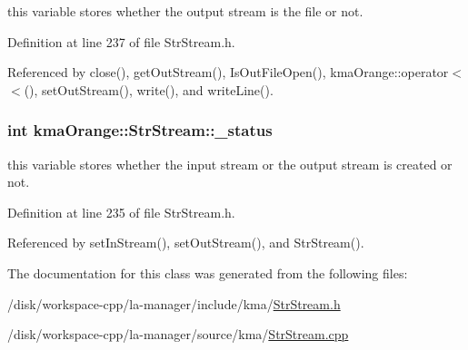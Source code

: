 this variable stores whether the output stream is the file or not. 



Definition at line 237 of file StrStream.h.

Referenced by close(), getOutStream(), IsOutFileOpen(), kmaOrange::operator$<$$<$(), setOutStream(), write(), and writeLine().\hypertarget{classkmaOrange_1_1StrStream_4e12ef11501334df836783f1f5328436}{
\subsubsection[{\_\-status}]{\setlength{\rightskip}{0pt plus 5cm}int {\bf kmaOrange::StrStream::\_\-status}}}
\label{classkmaOrange_1_1StrStream_4e12ef11501334df836783f1f5328436}


this variable stores whether the input stream or the output stream is created or not. 



Definition at line 235 of file StrStream.h.

Referenced by setInStream(), setOutStream(), and StrStream().

The documentation for this class was generated from the following files:\begin{CompactItemize}
\item 
/disk/workspace-cpp/la-manager/include/kma/\hyperlink{StrStream_8h}{StrStream.h}\item 
/disk/workspace-cpp/la-manager/source/kma/\hyperlink{StrStream_8cpp}{StrStream.cpp}\end{CompactItemize}
